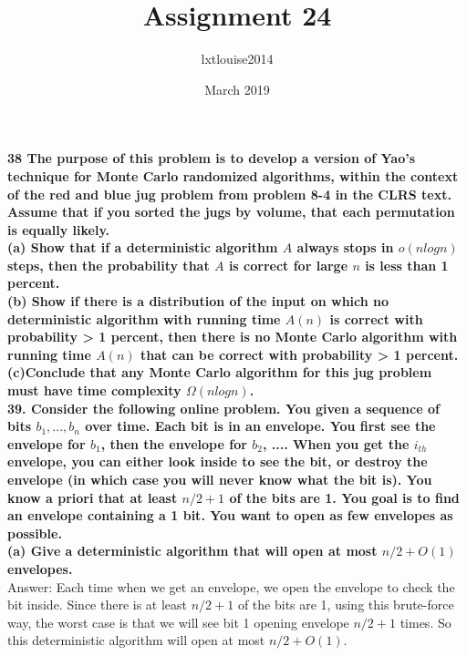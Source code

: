 \documentclass{article}
\title{Assignment 24}
\author{lxtlouise2014 }
\date{March 2019}
\begin{document}
\maketitle

\noindent
\textbf{38 The purpose of this problem is to develop a version of Yao’s technique for Monte Carlo randomized algorithms, within the context of the red and blue jug problem from problem 8-4 in the CLRS text. Assume that if you sorted the jugs by volume, that each permutation is equally likely.} \\ \newline
\textbf{(a) Show that if a deterministic algorithm $A$ always stops in $o(nlogn)$ steps, then the probability that $A$ is correct for large $n$ is less than 1 percent.} \\ \newline
\textbf{(b) Show if there is a distribution of the input on which no deterministic algorithm with running time $A(n)$ is correct with probability > 1 percent, then there is no Monte Carlo algorithm with running time $A(n)$ that can be correct with probability > 1 percent.} \\\newline
\textbf{(c)Conclude that any Monte Carlo algorithm for this jug problem must have time complexity $\Omega(nlogn)$.} \\ \newline
\textbf{39. Consider the following online problem. You given a sequence of bits $b_1, ... , b_n$ over time. Each bit is in an envelope. You first see the envelope for $b_1$, then the envelope for $b_2$, .... When you get the $i_{th}$ envelope, you can either look inside to see the bit, or destroy the envelope (in which case you will never know what the bit is). You know a priori that at least $n/2 + 1$ of the bits are 1. You goal is to find an envelope containing a 1 bit. You want to open as few envelopes as possible.} \\ \newline 
\textbf{(a) Give a deterministic algorithm that will open at most $n/2 + O(1)$ envelopes.} \\ \newline
Answer: Each time when we get an envelope, we open the envelope to check the bit inside. Since there is at least $n/2 + 1$ of the bits are 1, using this brute-force way, the worst case is that we will see bit 1 opening envelope $n/2 + 1$ times. So this deterministic algorithm will open at most $n/2 + O(1)$.\\ \newline
\end{document}
